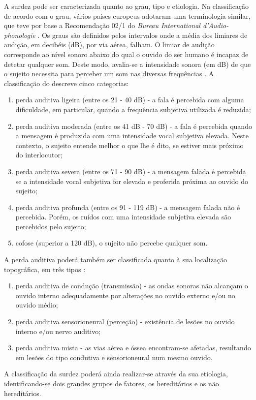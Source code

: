 \documentclass[output=paper,colorlinks,citecolor=brown,booklanguage=portuguese]{langscibook}
\begin{document}
A surdez pode ser caracterizada quanto ao grau, tipo e etiologia. Na classificação de acordo com o grau, vários países europeus adotaram uma terminologia similar, que teve por base a Recomendação 02/1 do \emph{Bureau International d’Audio-phonologie} \citep{BIAP1996}. Os graus são definidos pelos intervalos onde a média dos limiares de audição, em decibéis (dB), por via aérea, falham. O limiar de audição corresponde ao nível sonoro abaixo do qual o ouvido do ser humano é incapaz de detetar qualquer som. Deste modo, avalia-se a intensidade sonora (em dB) de que o sujeito necessita para perceber um som nas diversas frequências \citep{Cardona2013}. A classificação do \citet{BIAP1996} descreve cinco categorias:

\begin{enumerate}
\item 	perda auditiva ligeira (entre os 21 - 40 dB) - a fala é percebida com alguma dificuldade, em particular, quando a frequência subjetiva utilizada é reduzida;
\item 	perda auditiva moderada (entre os 41 dB - 70 dB) - a fala é percebida quando a mensagem é produzida com uma intensidade vocal subjetiva elevada. Neste contexto, o sujeito entende melhor o que lhe é dito, se estiver mais próximo do interlocutor;
\item 	perda auditiva severa (entre os 71 - 90 dB) - a mensagem falada é percebida se a intensidade vocal subjetiva for elevada e proferida próxima ao ouvido do sujeito;
\item 	perda auditiva profunda (entre os 91 - 119 dB) - a mensagem falada não é percebida. Porém, os ruídos com uma intensidade subjetiva elevada são percebidos pelo sujeito;
\item 	cofose (superior a 120 dB), o sujeito não percebe qualquer som.
\end{enumerate}
A perda auditiva poderá também ser classificada quanto à sua localização topográfica, em três tipos \citep{Monteiro2018}: 

\begin{enumerate}
\item  	perda auditiva de condução (transmissão) - as ondas sonoras não alcançam o ouvido interno adequadamente por alterações no ouvido externo e/ou no ouvido médio;
\item 	perda auditiva sensorioneural (perceção) - existência de lesões no ouvido interno e/ou nervo auditivo;
\item 	perda auditiva mista - as vias aérea e óssea encontram-se afetadas, resultando em lesões do tipo condutiva e sensorioneural num mesmo ouvido.
\end{enumerate}
A classificação da surdez poderá ainda realizar-se através da sua etiologia, identifi\-cando-se dois grandes grupos de fatores, os hereditários e os não hereditários. 
\end{document}
